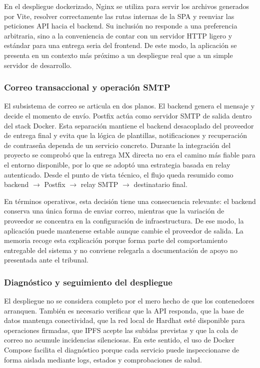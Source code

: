 \documentclass[11pt, a4paper]{article}
\begin{document}
En el despliegue dockerizado, Nginx se utiliza para servir los archivos generados por Vite, resolver correctamente las rutas internas de la SPA y reenviar las peticiones API hacia el backend. Su inclusión no responde a una preferencia arbitraria, sino a la conveniencia de contar con un servidor HTTP ligero y estándar para una entrega seria del frontend. De este modo, la aplicación se presenta en un contexto más próximo a un despliegue real que a un simple servidor de desarrollo.

\subsubsection{Correo transaccional y operación SMTP}

El subsistema de correo se articula en dos planos. El backend genera el mensaje y decide el momento de envío. Postfix actúa como servidor SMTP de salida dentro del stack Docker. Esta separación mantiene el backend desacoplado del proveedor de entrega final y evita que la lógica de plantillas, notificaciones y recuperación de contraseña dependa de un servicio concreto. Durante la integración del proyecto se comprobó que la entrega MX directa no era el camino más fiable para el entorno disponible, por lo que se adoptó una estrategia basada en relay autenticado. Desde el punto de vista técnico, el flujo queda resumido como backend $\rightarrow$ Postfix $\rightarrow$ relay SMTP $\rightarrow$ destinatario final.

En términos operativos, esta decisión tiene una consecuencia relevante: el backend conserva una única forma de enviar correo, mientras que la variación de proveedor se concentra en la configuración de infraestructura. De ese modo, la aplicación puede mantenerse estable aunque cambie el proveedor de salida. La memoria recoge esta explicación porque forma parte del comportamiento entregable del sistema y no conviene relegarla a documentación de apoyo no presentada ante el tribunal.

\subsubsection{Diagnóstico y seguimiento del despliegue}

El despliegue no se considera completo por el mero hecho de que los contenedores arranquen. También es necesario verificar que la API responda, que la base de datos mantenga conectividad, que la red local de Hardhat esté disponible para operaciones firmadas, que IPFS acepte las subidas previstas y que la cola de correo no acumule incidencias silenciosas. En este sentido, el uso de Docker Compose facilita el diagnóstico porque cada servicio puede inspeccionarse de forma aislada mediante logs, estados y comprobaciones de salud.
\end{document}
